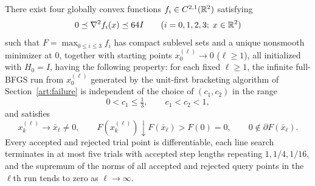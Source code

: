 \begin{theorem}
\label{art:local-failure}
There exist four globally convex functions $f_i\in C^{2,1}(\mathbb R^2)$ satisfying
\[
 0\preceq\nabla^2f_i(x)\preceq64I\qquad(i=0,1,2,3;\;x\in\mathbb R^2)
\]
such that $F=\max_{0\le i\le3}f_i$ has compact sublevel sets and a unique
nonsmooth minimizer at $0$, together with starting points $x_0^{(\ell)}\to0$
($\ell\ge1$), all initialized with $H_0=I$, having the following property: for
each fixed $\ell\ge1$, the infinite full-BFGS run from $x_0^{(\ell)}$ generated
by the unit-first bracketing algorithm of Section~\ref{art:failure} is
independent of the choice of $(c_1,c_2)$ in the range
\[
 0<c_1\le\tfrac13,\qquad c_1<c_2<1,
\]
and satisfies
\[
 x_k^{(\ell)}\longrightarrow\bar x_\ell\ne0,\qquad
 F(x_k^{(\ell)})\downarrow F(\bar x_\ell)>F(0)=0,\qquad
 0\notin\partial F(\bar x_\ell).
\]
Every accepted and rejected trial point is differentiable, each line search
terminates in at most five trials with accepted step lengths repeating
$1,1/4,1/16$, and the supremum of the norms of all accepted and rejected query
points in the $\ell$th run tends to zero as $\ell\to\infty$.
\end{theorem}
